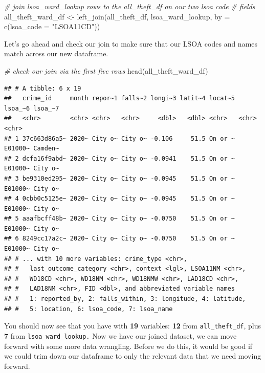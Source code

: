 \documentclass[
]{book}
\newenvironment{Shaded}{\begin{snugshade}}{\end{snugshade}}
\newcommand{\AttributeTok}[1]{\textcolor[rgb]{0.77,0.63,0.00}{#1}}
\newcommand{\CommentTok}[1]{\textcolor[rgb]{0.56,0.35,0.01}{\textit{#1}}}
\newcommand{\FunctionTok}[1]{\textcolor[rgb]{0.00,0.00,0.00}{#1}}
\newcommand{\NormalTok}[1]{#1}
\newcommand{\OtherTok}[1]{\textcolor[rgb]{0.56,0.35,0.01}{#1}}
\newcommand{\StringTok}[1]{\textcolor[rgb]{0.31,0.60,0.02}{#1}}
\begin{document}
\begin{Shaded}
\begin{Highlighting}[]
\CommentTok{\# join lsoa\_ward\_lookup rows to the all\_theft\_df on our two lsoa code}
\CommentTok{\# fields}
\NormalTok{all\_theft\_ward\_df }\OtherTok{\textless{}{-}} \FunctionTok{left\_join}\NormalTok{(all\_theft\_df, lsoa\_ward\_lookup, }\AttributeTok{by =} \FunctionTok{c}\NormalTok{(}\AttributeTok{lsoa\_code =} \StringTok{"LSOA11CD"}\NormalTok{))}
\end{Highlighting}
\end{Shaded}

Let's go ahead and check our join to make sure that our LSOA codes and names match across our new dataframe.

\begin{Shaded}
\begin{Highlighting}[]
\CommentTok{\# check our join via the first five rows}
\FunctionTok{head}\NormalTok{(all\_theft\_ward\_df)}
\end{Highlighting}
\end{Shaded}

\begin{verbatim}
## # A tibble: 6 x 19
##   crime_id     month repor~1 falls~2 longi~3 latit~4 locat~5 lsoa_~6 lsoa_~7
##   <chr>        <chr> <chr>   <chr>     <dbl>   <dbl> <chr>   <chr>   <chr>  
## 1 37c663d86a5~ 2020~ City o~ City o~ -0.106     51.5 On or ~ E01000~ Camden~
## 2 dcfa16f9abd~ 2020~ City o~ City o~ -0.0941    51.5 On or ~ E01000~ City o~
## 3 be9310ed295~ 2020~ City o~ City o~ -0.0945    51.5 On or ~ E01000~ City o~
## 4 0cbb0c5125e~ 2020~ City o~ City o~ -0.0945    51.5 On or ~ E01000~ City o~
## 5 aaafbcff48b~ 2020~ City o~ City o~ -0.0750    51.5 On or ~ E01000~ City o~
## 6 8249cc17a2c~ 2020~ City o~ City o~ -0.0750    51.5 On or ~ E01000~ City o~
## # ... with 10 more variables: crime_type <chr>,
## #   last_outcome_category <chr>, context <lgl>, LSOA11NM <chr>,
## #   WD18CD <chr>, WD18NM <chr>, WD18NMW <chr>, LAD18CD <chr>,
## #   LAD18NM <chr>, FID <dbl>, and abbreviated variable names
## #   1: reported_by, 2: falls_within, 3: longitude, 4: latitude,
## #   5: location, 6: lsoa_code, 7: lsoa_name
\end{verbatim}

You should now see that you have with \textbf{19} variables: \textbf{12} from \texttt{all\_theft\_df}, plus \textbf{7} from \texttt{lsoa\_ward\_lookup.} Now we have our joined dataset, we can move forward with some more data wrangling. Before we do this, it would be good if we could trim down our dataframe to only the relevant data that we need moving forward.
\end{document}
